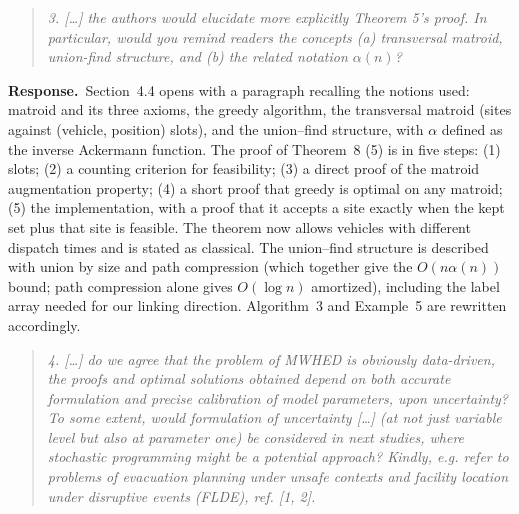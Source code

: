 \documentclass[11pt]{article}
\newenvironment{comment}{\par\medskip\begin{quote}\small\itshape}{\end{quote}}
\newcommand{\reply}{\noindent\textbf{Response.}\ }
\begin{document}
\begin{comment}
3. [\dots] the authors would elucidate more explicitly Theorem 5's
proof. In particular, would you remind readers the concepts (a)
transversal matroid, union-find structure, and (b) the related notation
$\alpha(n)$?
\end{comment}

\reply Section~4.4 opens with a paragraph recalling the notions used:
matroid and its three axioms, the greedy algorithm, the transversal
matroid (sites against (vehicle, position) slots), and the union--find
structure, with $\alpha$ defined as the inverse Ackermann function. The
proof of Theorem~8 (5) is in five steps: (1) slots; (2) a counting
criterion for feasibility; (3) a direct proof of the matroid augmentation
property; (4) a short proof that greedy is optimal on any matroid; (5) the
implementation, with a proof that it accepts a site exactly when the kept
set plus that site is feasible. The theorem now allows vehicles with
different dispatch times and is stated as classical. The union--find structure is described with
union by size and path compression (which together give the
$O(n\alpha(n))$ bound; path compression alone gives $O(\log n)$
amortized), including the label array needed for our linking direction.
Algorithm~3 and Example~5 are rewritten accordingly.

\begin{comment}
4. [\dots] do we agree that the problem of MWHED is obviously
data-driven, the proofs and optimal solutions obtained depend on both
accurate formulation and precise calibration of model parameters, upon
uncertainty? To some extent, would formulation of uncertainty [\dots]
(at not just variable level but also at parameter one) be considered in
next studies, where stochastic programming might be a potential
approach? Kindly, e.g. refer to problems of evacuation planning under
unsafe contexts and facility location under disruptive events (FLDE),
ref. [1, 2].
\end{comment}
\end{document}
